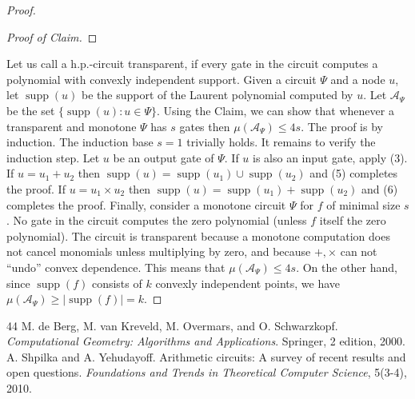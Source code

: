 \documentclass[10pt,a4paper]{article}
\newcommand{\supp}{\operatorname{supp}}
\begin{document}
\begin{proof}
\begin{proof}[Proof of Claim]
\end{proof}
Let us call a h.p.-circuit transparent, if every gate in the circuit computes a polynomial with convexly independent support. Given a circuit $\Psi$ and a node $u$, let $\supp(u)$ be the support of the Laurent polynomial computed by $u$. Let $\mathcal A_\Psi$ be the set $\{\supp(u):u\in\Psi\}$.
Using the Claim, we can show that whenever a transparent and monotone $\Psi$ has $s$ gates then $\mu(\mathcal A_\Psi)\le4s$. The proof is by induction. The induction base $s=1$ trivially holds. It remains to verify the induction step. Let $u$ be an output gate of $\Psi$. If $u$ is also an input gate, apply (3).
If $u=u_1+u_2$ then $\supp(u)=\supp(u_1)\cup\supp(u_2)$ and (5) completes the proof.
If $u=u_1\times u_2$ then $\supp(u)=\supp(u_1)+\supp(u_2)$ and (6) completes the proof.
Finally, consider a monotone circuit $\Psi$ for $f$ of minimal size $s$. No gate in the circuit computes the zero polynomial (unless $f$ itself the zero polynomial). The circuit is transparent because a monotone computation does not cancel monomials unless multiplying by zero, and because $+,\times$ can not ``undo'' convex dependence. This means that $\mu(\mathcal A_\Psi)\le4s$. On the other hand, since $\supp(f)$ consists of $k$ convexly independent points, we have $\mu(\mathcal A_\Psi)\ge|\supp(f)|=k$.
\end{proof}

\begin{thebibliography}{44}
 M. de Berg, M. van Kreveld, M. Overmars, and O. Schwarzkopf. \emph{Computational Geometry: Algorithms and Applications}. Springer, 2 edition, 2000.
 A. Shpilka and A. Yehudayoff. Arithmetic circuits: A survey of recent results and open questions. \emph{Foundations and Trends in Theoretical Computer Science}, 5(3-4), 2010.
\end{thebibliography}
\end{document}
